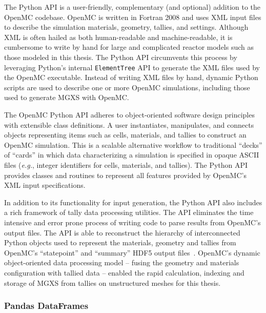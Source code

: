 
The Python \ac{API} is a user-friendly, complementary (and optional) addition to the OpenMC codebase. OpenMC is written in Fortran 2008 and uses \ac{XML} input files to describe the simulation materials, geometry, tallies, and settings. Although \ac{XML} is often hailed as both human-readable and machine-readable, it is cumbersome to write by hand for large and complicated reactor models such as those modeled in this thesis. The Python \ac{API} circumvents this process by leveraging Python's internal \texttt{ElementTree} \ac{API} to generate the \ac{XML} files used by the OpenMC executable. Instead of writing \ac{XML} files by hand, dynamic Python scripts are used to describe one or more OpenMC simulations, including those used to generate \ac{MGXS} with OpenMC.

The OpenMC Python \ac{API} adheres to object-oriented software design principles with extensible class definitions. A user instantiates, manipulates, and connects objects representing items such as cells, materials, and tallies to construct an OpenMC simulation. This is a scalable alternative workflow to traditional ``decks'' of ``cards'' in which data characterizing a simulation is specified in opaque \ac{ASCII} files (\textit{e.g.}, integer identifiers for cells, materials, and tallies). The Python \ac{API} provides classes and routines to represent all features provided by OpenMC's \ac{XML} input specifications.

In addition to its functionality for input generation, the Python \ac{API} also includes a rich framework of tally data processing utilities. The \ac{API} eliminates the time intensive and error prone process of writing code to parse results from OpenMC's output files. The \ac{API} is able to reconstruct the hierarchy of interconnected Python objects used to represent the materials, geometry and tallies from OpenMC's ``statepoint'' and ``summary'' \ac{HDF5} output files~\cite{koranne2011hdf5}. OpenMC's dynamic object-oriented data processing model -- fusing the geometry and materials configuration with tallied data -- enabled the rapid calculation, indexing and storage of \ac{MGXS} from tallies on unstructured meshes for this thesis.
  
\subsubsection{Pandas DataFrames}
\label{sec:chap3-pandas-df}

